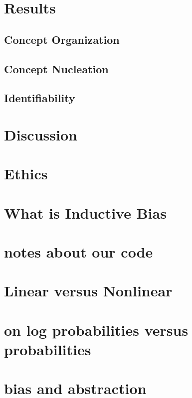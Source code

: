 \section{Results}

\subsection{Concept Organization}

\subsection{Concept Nucleation}

\subsection{Identifiability}

\section{Discussion}

\section{Ethics}


\section{What is Inductive Bias} %

\section{notes about our code} %

\section{Linear versus Nonlinear} %

\section{on log probabilities versus probabilities} %


\section{bias and abstraction} %

